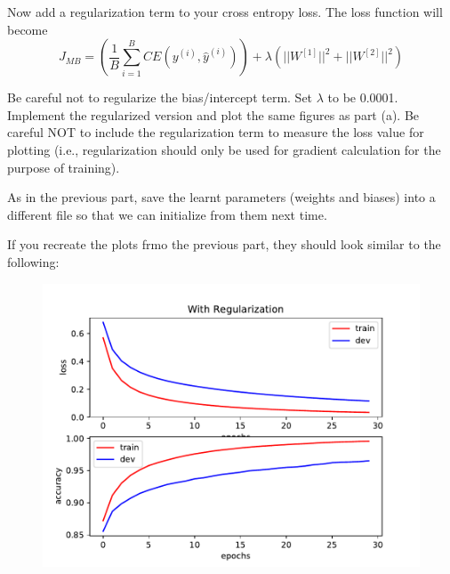 \item {} Now add a regularization term to your cross entropy loss.
The loss function will become \begin{equation*}
  J_{MB} = \left(\frac{1}{B}\sum_{i=1}^{B}CE(y^{(i)}, \hat{y}^{(i)})\right) + \lambda \left(||W^{[1]}||^2 + ||W^{[2]}||^2 \right)
  \end{equation*}

Be careful not to regularize the bias/intercept term.
Set $\lambda$ to be 0.0001. Implement the regularized version and plot the same
figures as part (a). Be careful NOT to include the regularization term to measure
the loss value for plotting (i.e., regularization should only be used for gradient calculation for
the purpose of training).

As in the previous part, save the learnt parameters (weights and biases) into a
different file so that we can initialize from them next time.

\clearpage\newpage
If you recreate the plots frmo the previous part, they should look similar to the following:

\begin{figure}[H]
    \centering
    \includegraphics[scale=0.75]{mnist/regularized.pdf}
\end{figure}